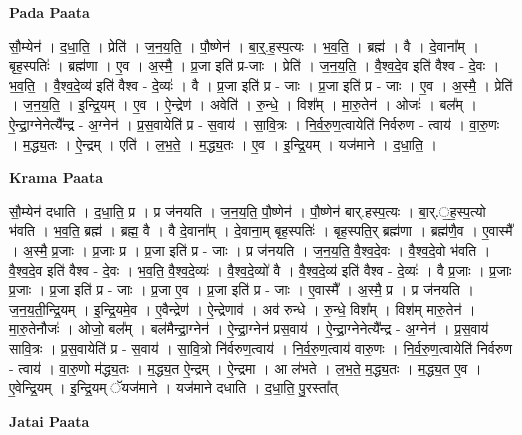 \documentclass[17pt]{extarticle}
\begin{document}
\textbf{Pada Paata} \newline

सौ॒म्येन॑ । द॒धा॒ति॒ । प्रेति॑ । ज॒न॒य॒ति॒ । पौ॒ष्णेन॑ । बा॒र्॒.ह॒स्प॒त्यः । भ॒व॒ति॒ । ब्रह्म॑ । वै । दे॒वाना᳚म् । बृह॒स्पतिः॑ । ब्रह्म॑णा । ए॒व । अ॒स्मै॒ । प्र॒जा इति॑ प्र-जाः । प्रेति॑ । ज॒न॒य॒ति॒ । वै॒श्व॒दे॒व इति॑ वैश्व - दे॒वः । भ॒व॒ति॒ । वै॒श्व॒दे॒व्य॑ इति॑ वैश्व - दे॒व्यः॑ । वै । प्र॒जा इति॑ प्र - जाः । प्र॒जा इति॑ प्र - जाः । ए॒व । अ॒स्मै॒ । प्रेति॑ । ज॒न॒य॒ति॒ । इ॒न्द्रि॒यम् । ए॒व । ऐ॒न्द्रेण॑ । अवेति॑ । रु॒न्धे॒ । विश᳚म् । मा॒रु॒तेन॑ । ओजः॑ । बल᳚म् । ऐ॒न्द्रा॒ग्नेनेत्यै᳚न्द्र - अ॒ग्नेन॑ । प्र॒स॒वायेति॑ प्र - स॒वाय॑ । सा॒वि॒त्रः । नि॒र्व॒रु॒ण॒त्वायेति॑ निर्वरुण - त्वाय॑ । वा॒रु॒णः । म॒द्ध्य॒तः । ऐ॒न्द्रम् । एति॑ । ल॒भ॒ते॒ । म॒द्ध्य॒तः । ए॒व । इ॒न्द्रि॒यम् । यज॑माने । द॒धा॒ति॒ ।  \newline


\textbf{Krama Paata} \newline

सौ॒म्येन॑ दधाति । द॒धा॒ति॒ प्र । प्र ज॑नयति । ज॒न॒य॒ति॒ पौ॒ष्णेन॑ । पौ॒ष्णेन॑ बार्.हस्प॒त्यः । बा॒र्.॒ह॒स्प॒त्यो भ॑वति । भ॒व॒ति॒ ब्रह्म॑ । ब्रह्म॒ वै । वै दे॒वाना᳚म् । दे॒वाना॒म् बृह॒स्पतिः॑ । बृह॒स्पति॒र् ब्रह्म॑णा । ब्रह्म॑णै॒व । ए॒वास्मै᳚ । अ॒स्मै॒ प्र॒जाः । प्र॒जाः प्र । प्र॒जा इति॑ प्र - जाः । प्र ज॑नयति । ज॒न॒य॒ति॒ वै॒श्व॒दे॒वः । वै॒श्व॒दे॒वो भ॑वति । वै॒श्व॒दे॒व इति॑ वैश्व - दे॒वः । भ॒व॒ति॒ वै॒श्व॒दे॒व्यः॑ । वै॒श्व॒दे॒व्यो॑ वै । वै॒श्व॒दे॒व्य॑ इति॑ वैश्व - दे॒व्यः॑ । वै प्र॒जाः । प्र॒जाः प्र॒जाः । प्र॒जा इति॑ प्र - जाः । प्र॒जा ए॒व । प्र॒जा इति॑ प्र - जाः । ए॒वास्मै᳚ । अ॒स्मै॒ प्र । प्र ज॑नयति । ज॒न॒य॒ती॒न्द्रि॒यम् । इ॒न्द्रि॒यमे॒व । ए॒वैन्द्रेण॑ । ऐ॒न्द्रेणाव॑ । अव॑ रुन्धे । रु॒न्धे॒ विश᳚म् । विश॑म् मारु॒तेन॑ । मा॒रु॒तेनौजः॑ । ओजो॒ बल᳚म् । बल॑मैन्द्रा॒ग्नेन॑ । ऐ॒न्द्रा॒ग्नेन॑ प्रस॒वाय॑ । ऐ॒न्द्रा॒ग्नेनेत्यै᳚न्द्र - अ॒ग्नेन॑ । प्र॒स॒वाय॑ सावि॒त्रः । प्र॒स॒वायेति॑ प्र - स॒वाय॑ । सा॒वि॒त्रो नि॑र्वरुण॒त्वाय॑ । नि॒र्व॒रु॒ण॒त्वाय॑ वारु॒णः । नि॒र्व॒रु॒ण॒त्वायेति॑ निर्वरुण - त्वाय॑ । वा॒रु॒णो म॑द्ध्य॒तः । म॒द्ध्य॒त ऐ॒न्द्रम् । ऐ॒न्द्रमा । आ ल॑भते । ल॒भ॒ते॒ म॒द्ध्य॒तः । म॒द्ध्य॒त ए॒व । ए॒वेन्द्रि॒यम् । इ॒न्द्रि॒यम् ॅयज॑माने । यज॑माने दधाति । द॒धा॒ति॒ पु॒रस्ता᳚त् \newline

\textbf{Jatai Paata} \newline
\end{document}
